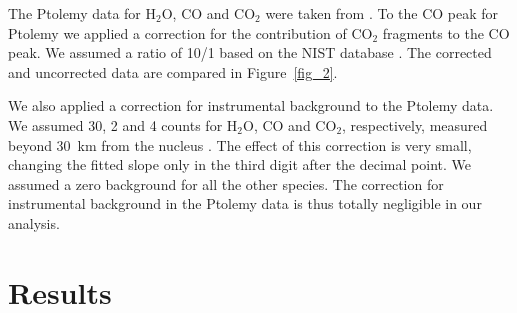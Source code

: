 \documentclass{aa}
\begin{document}
The Ptolemy data for $\mathrm{H_2O}$, CO and 
$\mathrm{CO_2}$ were taken from \citet[][their Tab.~3]{morse2015}. 
 To the CO peak for Ptolemy we  applied a correction for the contribution of $\mathrm{CO_2}$
fragments to the CO peak. We  assumed a ratio of 10/1 based on the NIST database
\citep{stein2015,morse2015}. The corrected and uncorrected data are compared in Figure~\ref{fig_2}. 

We also applied a correction for instrumental background to the 
Ptolemy data. We assumed 30, 2 and 4 counts for
$\mathrm{H_2O}$, CO and $\mathrm{CO_2}$, respectively, measured beyond 30~km from the nucleus \citep{morse2015}. 
The effect of this correction is very small, changing the fitted slope only in the third digit after the 
decimal point. We assumed a zero background for all the other species. The correction for instrumental 
background in the Ptolemy data is thus totally negligible in our analysis. 
 

\section{Results}

\label{sec_discussion}
\end{document}
